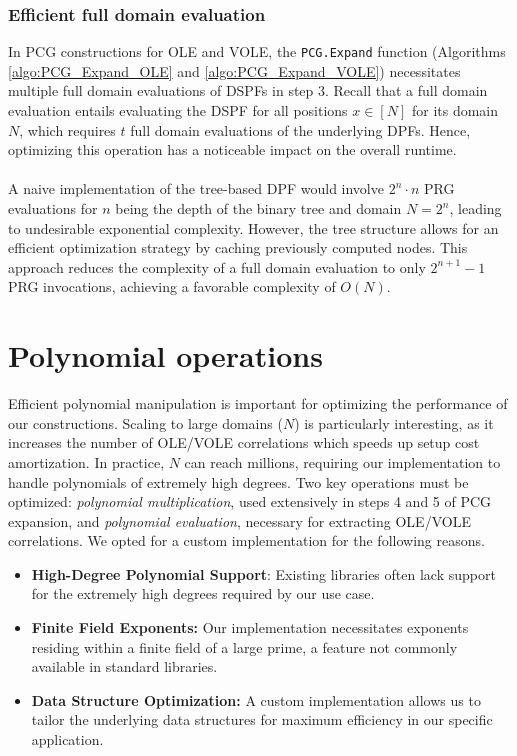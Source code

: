 \subsubsection{Efficient full domain evaluation}
In PCG constructions for OLE and VOLE, the \texttt{PCG.Expand} function (Algorithms \ref{algo:PCG_Expand_OLE} and \ref{algo:PCG_Expand_VOLE}) necessitates multiple full domain evaluations of DSPFs in step 3. Recall that a full domain evaluation entails evaluating the DSPF for all positions $x \in [N]$ for its domain $N$, which requires $t$ full domain evaluations of the underlying DPFs. Hence, optimizing this operation has a noticeable impact on the overall runtime. 
\\\\
A naive implementation of the tree-based DPF would involve $2^n\cdot n$ PRG evaluations for $n$ being the depth of the binary tree and domain $N = 2^n$, leading to undesirable exponential complexity. However, the tree structure allows for an efficient optimization strategy by caching previously computed nodes. This approach reduces the complexity of a full domain evaluation to only $2^{n+1}-1$ PRG invocations, achieving a favorable complexity of $O(N)$.

\section{Polynomial operations}
Efficient polynomial manipulation is important for optimizing the performance of our constructions. Scaling to large domains ($N$) is particularly interesting, as it increases the number of OLE/VOLE correlations which speeds up setup cost amortization. In practice, $N$ can reach millions, requiring our implementation to handle polynomials of extremely high degrees. Two key operations must be optimized: \textit{polynomial multiplication}, used extensively in steps 4 and 5 of PCG expansion, and \textit{polynomial evaluation}, necessary for extracting OLE/VOLE correlations. We opted for a custom implementation for the following reasons.
\begin{itemize}
\item \textbf{High-Degree Polynomial Support}: Existing libraries often lack support for the extremely high degrees required by our use case.
\item \textbf{Finite Field Exponents:} Our implementation necessitates exponents residing within a finite field of a large prime, a feature not commonly available in standard libraries.
\item \textbf{Data Structure Optimization:} A custom implementation allows us to tailor the underlying data structures for maximum efficiency in our specific application.
\end{itemize}

